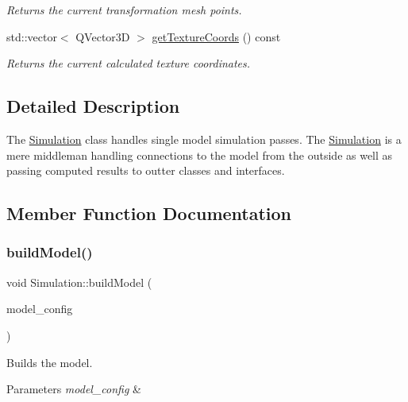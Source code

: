 \begin{DoxyCompactItemize}
\begin{DoxyCompactList}\small\item\em Returns the current transformation mesh points. \end{DoxyCompactList}\item 
std\+::vector$<$ Q\+Vector3D $>$ \mbox{\hyperlink{class_simulation_a7dfcbd7e6fe8e6c1c57e01f8367da642}{get\+Texture\+Coords}} () const
\begin{DoxyCompactList}\small\item\em Returns the current calculated texture coordinates. \end{DoxyCompactList}\end{DoxyCompactItemize}


\subsection{Detailed Description}
The \mbox{\hyperlink{class_simulation}{Simulation}} class handles single model simulation passes. The \mbox{\hyperlink{class_simulation}{Simulation}} is a mere middleman handling connections to the model from the outside as well as passing computed results to outter classes and interfaces. 

\subsection{Member Function Documentation}
\mbox{\label{class_simulation_a6b801c919ee95c0d967a8037cd73afe5}} 
\subsubsection{\texorpdfstring{build\+Model()}{buildModel()}}
{\footnotesize\ttfamily void Simulation\+::build\+Model (\begin{DoxyParamCaption}\item[{\mbox{\hyperlink{struct_model_config}{Model\+Config}} $\ast$}]{model\+\_\+config }\end{DoxyParamCaption})}



Builds the model. 


\begin{DoxyParams}{Parameters}
{\em model\+\_\+config} & \\
\hline
\end{DoxyParams}
\mbox{\label{class_simulation_a7dfcbd7e6fe8e6c1c57e01f8367da642}} 
